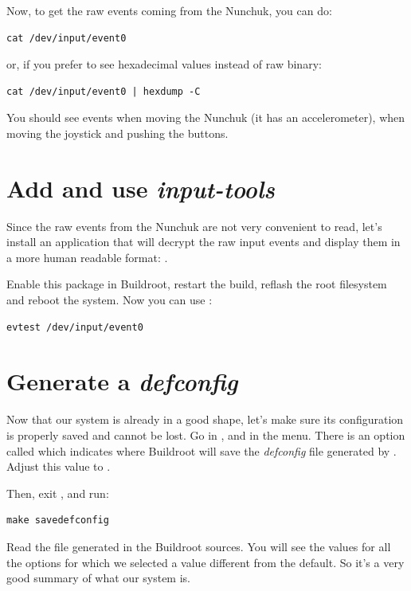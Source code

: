 Now, to get the raw events coming from the Nunchuk, you can do:

\begin{verbatim}
cat /dev/input/event0
\end{verbatim}

or, if you prefer to see hexadecimal values instead of raw binary:

\begin{verbatim}
cat /dev/input/event0 | hexdump -C
\end{verbatim}

You should see events when moving the Nunchuk (it has an
accelerometer), when moving the joystick and pushing the buttons.

\section{Add and use {\em input-tools}}

Since the raw events from the Nunchuk are not very convenient to read,
let's install an application that will decrypt the raw input events
and display them in a more human readable format: .

Enable this package in Buildroot, restart the build, reflash the root
filesystem and reboot the system. Now you can use :

\begin{verbatim}
evtest /dev/input/event0
\end{verbatim}

\section{Generate a {\em defconfig}}

Now that our system is already in a good shape, let's make sure its
configuration is properly saved and cannot be lost. Go in
, and in the  menu. There is an
option called  which indicates
where Buildroot will save the {\em defconfig} file generated by
. Adjust this value to
.

Then, exit , and run:

\begin{verbatim}
make savedefconfig
\end{verbatim}

Read the file  generated in the
Buildroot sources. You will see the values for all the options for
which we selected a value different from the default. So it's a very
good summary of what our system is.

